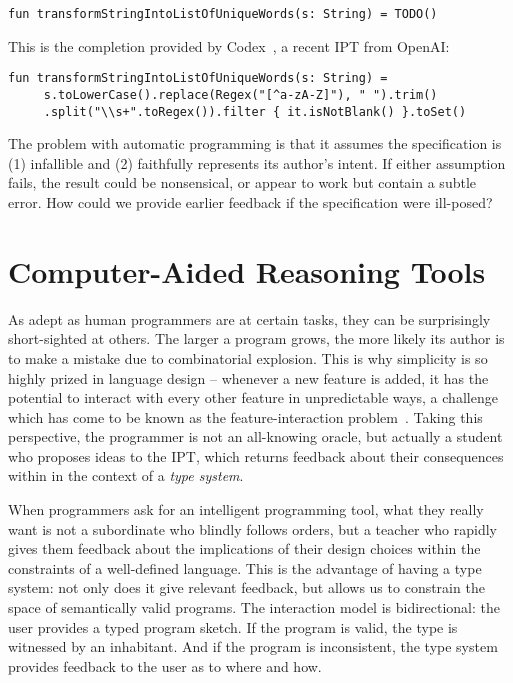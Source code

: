 \documentclass[10pt]{article}
\begin{document}
\begin{lstlisting}[basicstyle=\small\ttfamily]
  fun transformStringIntoListOfUniqueWords(s: String) = TODO()
\end{lstlisting}

\noindent This is the completion provided by Codex~\cite{chen2021evaluating}, a recent IPT from OpenAI:

\begin{lstlisting}[basicstyle=\small\ttfamily]
  fun transformStringIntoListOfUniqueWords(s: String) =
     s.toLowerCase().replace(Regex("[^a-zA-Z]"), " ").trim()
     .split("\\s+".toRegex()).filter { it.isNotBlank() }.toSet()
\end{lstlisting}

\noindent The problem with automatic programming is that it assumes the specification is (1) infallible and (2) faithfully represents its author's intent. If either assumption fails, the result could be nonsensical, or appear to work but contain a subtle error. How could we provide earlier feedback if the specification were ill-posed?

\section{Computer-Aided Reasoning Tools}\label{sec:computer-aided-reasoning-tools}

As adept as human programmers are at certain tasks, they can be surprisingly short-sighted at others. The larger a program grows, the more likely its author is to make a mistake due to combinatorial explosion. This is why simplicity is so highly prized in language design -- whenever a new feature is added, it has the potential to interact with every other feature in unpredictable ways, a challenge which has come to be known as the feature-interaction problem~\cite{apel2013exploring}. Taking this perspective, the programmer is not an all-knowing oracle, but actually a student who proposes ideas to the IPT, which returns feedback about their consequences within in the context of a \textit{type system}.

When programmers ask for an intelligent programming tool, what they really want is not a subordinate who blindly follows orders, but a teacher who rapidly gives them feedback about the implications of their design choices within the constraints of a well-defined language. This is the advantage of having a type system: not only does it give relevant feedback, but allows us to constrain the space of semantically valid programs. The interaction model is bidirectional: the user provides a typed program sketch. If the program is valid, the type is witnessed by an inhabitant. And if the program is inconsistent, the type system provides feedback to the user as to where and how.
\end{document}
